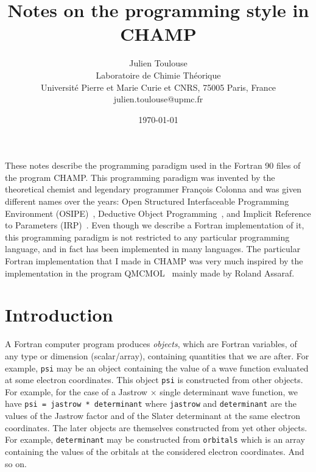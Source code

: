\documentclass[a4paper,11pt]{article}
\begin{document}
\title{Notes on the programming style in CHAMP}

\author{Julien Toulouse\\
Laboratoire de Chimie Th\'eorique\\Universit\'e Pierre et Marie Curie et CNRS, 75005 Paris, France\\
julien.toulouse@upmc.fr}

\date{\today}

\maketitle

These notes describe the programming paradigm used in the Fortran 90 files of the program CHAMP. This programming paradigm was invented by the theoretical chemist and legendary programmer François Colonna and was given different names over the years: Open Structured Interfaceable Programming Environment (OSIPE)~\cite{ColJolPoiAngJan-CPC-94}, Deductive Object Programming~\cite{Col-ARX-06}, and Implicit Reference to Parameters (IRP)~\cite{Sce-ARX-09}. Even though we describe a Fortran implementation of it, this programming paradigm is not restricted to any particular programming language, and in fact has been implemented in many languages. The particular Fortran implementation that I made in CHAMP was very much inspired by the implementation in the program QMCMOL~\cite{Qmc-PROG-XX} mainly made by Roland Assaraf.

\section{Introduction}
A Fortran computer program produces {\it objects}, which are Fortran variables, of any type or dimension (scalar/array), containing quantities that we are after. For example, {\tt psi} may be an object containing the value of a wave function evaluated at some electron coordinates. This object {\tt psi} is constructed from other objects. For example, for the case of a Jastrow $\times$ single determinant wave function, we have {\tt psi = jastrow * determinant} where {\tt jastrow} and {\tt determinant} are the values of the Jastrow factor and of the Slater determinant at the same electron coordinates. The later objects are themselves constructed from yet other objects. For example, {\tt determinant} may be constructed from {\tt orbitals} which is an array containing the values of the orbitals at the considered electron coordinates. And so on.
\end{document}
